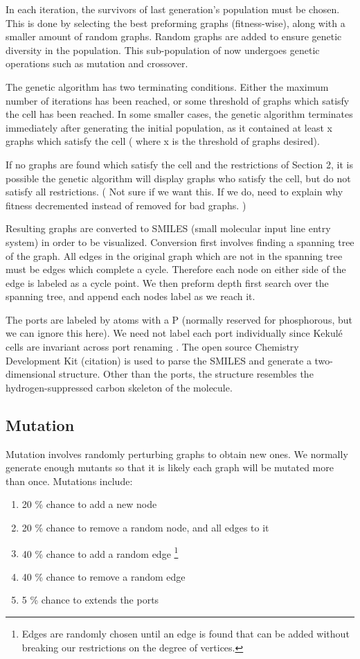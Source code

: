 \documentclass[12pt]{article}
\begin{document}
In each iteration, the survivors of last generation's population must be chosen. This is done by selecting the best preforming graphs (fitness-wise), along with a smaller amount of random graphs. Random graphs are added to ensure genetic diversity in the population. This sub-population of now undergoes genetic operations such as mutation and crossover. 

The genetic algorithm has two terminating conditions. Either the maximum number of iterations has been reached, or some threshold of graphs which satisfy the cell has been reached. In some smaller cases, the genetic algorithm terminates immediately after generating the initial population, as it contained at least x graphs which satisfy the cell ( where x is the threshold of graphs desired).

If no graphs are found which satisfy the cell and the restrictions of Section 2, it is possible the genetic algorithm will display graphs who satisfy the cell, but do not satisfy all restrictions. ( Not sure if we want this. If we do, need to explain why fitness decremented instead of removed for bad graphs. )

Resulting graphs are converted to SMILES (small molecular input line entry system) in order to be visualized. Conversion first involves finding a spanning tree of the graph. All edges in the original graph which are not in the spanning tree must be edges which complete a cycle. Therefore each node on either side of the edge is labeled as a cycle point. We then preform depth first search over the spanning tree, and append each nodes label as we reach it.

The ports are labeled by atoms with a P (normally reserved for phosphorous, but we can ignore this here). We need not label each port individually since Kekul\'e cells are invariant across port renaming \cite{H13}. The open source Chemistry Development Kit (citation) is used to parse the SMILES and generate a two-dimensional structure. Other than the ports, the structure resembles the hydrogen-suppressed carbon skeleton of the molecule.  

\subsection{Mutation}

Mutation involves randomly perturbing graphs to obtain new ones. We normally  generate enough mutants so that it is likely each graph will be mutated more than once. Mutations include:
\begin{enumerate}
\item 20 \% chance to add a new node
\item 20 \%  chance to remove a random node, and all edges to it
\item 40 \% chance to add a random edge \footnote{ Edges are randomly chosen until an edge is found that can be added without breaking our restrictions on the degree of vertices.}
\item 40 \% chance to remove a random edge
\item 5 \% chance to extends the ports
\end{enumerate}
\end{document}
